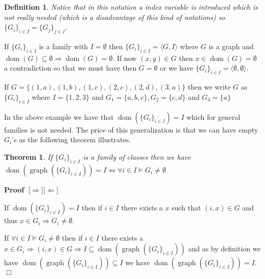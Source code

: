 \documentclass{book}
\newcommand{\tmop}[1]{\ensuremath{\operatorname{#1}}}
\newenvironment{proof}{\noindent\textbf{Proof\ }}{\hspace*{\fill}$\Box$\medskip}
\newtheorem{definition}{Definition}
{\theorembodyfont{\rmfamily}\newtheorem{example}{Example}}
\newtheorem{theorem}{Theorem}
\begin{document}
{{\begin{definition}
  Notice that in this notation a index variable is introduced which is not
  really needed (which is a disadvantage of this kind of notations) so $\{ G_i
  \}_{i \in I} = \{ G_j \}_{j \in I}$.
\end{definition}

\begin{example}
  \label{empty family}If $\{ G_i \}_{i \in I}$ is a family with $I =
  \emptyset$ then $\{ G_i \}_{i \in I} = \langle G, I \rangle$ where $G$ is a
  graph and $\tmop{dom} (G) \subseteq \emptyset \Rightarrow \tmop{dom} (G) =
  \emptyset$. If now $(x, y) \in G$ then $x \in \tmop{dom} (G) = \emptyset$ a
  contradiction so that we must have then $G = \emptyset$ or we have $\{ G_i
  \}_{i \in I} = \langle \emptyset, \emptyset \rangle$.
\end{example}

\begin{example}
  If $G = \{ (1, a), (1, b), (1, c), (2, c), (2, d), (3, a) \}$ then we write
  $G$ as $\{ G_i \}_{i \in I}$ where $I = \{ 1, 2, 3 \}$ and $G_1 = \{ a, b, c
  \}, G_2 = \{ c, d \}$ and $G_3 = \{ a \}$
\end{example}

In the above example we have that $\tmop{dom} (\{ G_i \}_{i \in I}) = I$ which
for general families is not needed. The price of this generalization is that
we can have empty $G_i$'s as the following theorem illustrates.

\begin{theorem}
  If $\{ G_i \}_{i \in I}$ is a family of classes then we have $\tmop{dom}
  (\tmop{graph} (\{ G_i \}_{i \in I})) = I \Leftrightarrow \forall i \in I
  \vDash G_i \neq \emptyset$
\end{theorem}

\begin{proof}[$\Rightarrow$][$\Leftarrow$]
  
  
  If $\tmop{dom} (\{ G_i \}_{i \in I}) = I$ then if $i \in I$ there exists a
  $x$ such that $(i, x) \in G$ and thus $x \in G_i \Rightarrow G_i \neq
  \emptyset$.
  
  If $\forall i \in I \vDash G_i \neq \emptyset$ then if $i \in I$ there
  exists a $x \in G_i \Rightarrow (i, x) \in G \Rightarrow I \subseteq
  \tmop{dom} (\tmop{graph} (\{ G_i \}_{i \in I}))$ and as by definition we
  have $\tmop{dom} (\tmop{graph} (\{ G_i \}_{i \in I})) \subseteq I$ we have
  $\tmop{dom} (\tmop{graph} (\{ G_i \}_{i \in I})) = I$.
\end{proof}

}}
\end{document}
